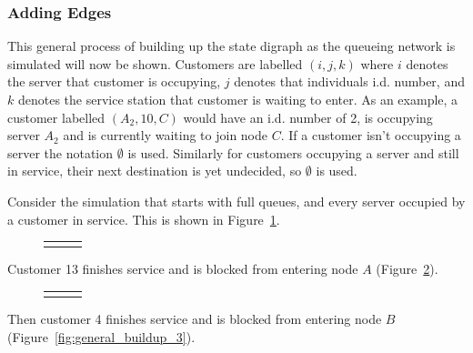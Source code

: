 \documentclass{article}
\begin{document}
\subsubsection{Adding Edges}

This general process of building up the state digraph as the queueing network is simulated will now be shown.
Customers are labelled $(i, j, k)$ where $i$ denotes the server that customer is occupying, $j$ denotes that individuals i.d. number, and $k$ denotes the service station that customer is waiting to enter.
As an example, a customer labelled $(A_2, 10, C)$ would have an i.d. number of 2, is occupying server $A_2$ and is currently waiting to join node $C$.
If a customer isn't occupying a server the notation $\emptyset$ is used.
Similarly for customers occupying a server and still in service, their next destination is yet undecided, so $\emptyset$ is used.

Consider the simulation that starts with full queues, and every server occupied by a customer in service. This is shown in Figure~\ref{fig:general_buildup_1}.

\begin{figure}[H]
  \begin{tabular}{ c c c }
       & \hspace{0.1\textwidth} &
       \\
  \end{tabular}
  \caption{}
  \label{fig:general_buildup_1}
\end{figure}

Customer 13 finishes service and is blocked from entering node $A$ (Figure~\ref{fig:general_buildup_2}).

\begin{figure}[H]
  \begin{tabular}{ c c c }
       & \hspace{0.1\textwidth} &
       \\
  \end{tabular}
  \caption{}
  \label{fig:general_buildup_2}
\end{figure}

Then customer 4 finishes service and is blocked from entering node $B$ (Figure~\ref{fig:general_buildup_3}).
\end{document}
